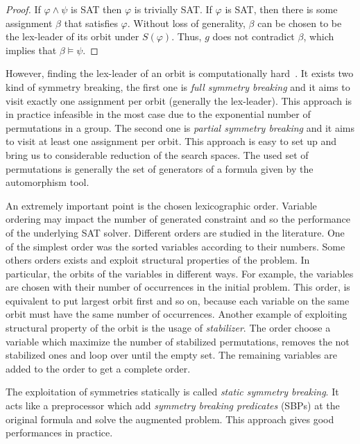 \begin{proof}
	If $\varphi \wedge \psi$ is SAT then $\varphi$ is trivially SAT. If
	$\varphi$ is SAT, then there is some assignment $\beta$ that satisfies $\varphi$.
	Without loss of generality, $\beta$ can be chosen to be the lex-leader of its
	orbit under $S(\varphi)$. Thus, $g$ does not contradict $\beta$, which implies that
	$\beta \models \psi$.
\end{proof}

 


However, finding the lex-leader of an orbit is computationally hard~\cite{Luks2004}.
It exists two kind of symmetry breaking, the first one is \emph{full symmetry breaking} and it 
aims to visit exactly one assignment per orbit (generally the lex-leader). This
approach is in practice infeasible in the most case due to the exponential number of permutations in a group.
The second one is \emph{partial symmetry breaking} and it aims to visit at least one assignment per orbit. This approach is easy to set up and bring us to considerable reduction of the search spaces. The used set
of permutations is generally the set of generators of a formula given by the automorphism tool.


An extremely important point is the chosen lexicographic order.
Variable ordering may impact the number of generated constraint and so the performance of
the underlying SAT solver. Different orders are studied in the literature. 
One of the simplest order was the sorted variables according to their numbers.
Some others orders exists and exploit structural properties of the 
problem. In particular, the orbits of the variables in different ways. For example, the variables are chosen 
with their number of occurrences in the initial problem. This order, is equivalent to put largest orbit first
and so on, because each variable on the same orbit must have the same number of occurrences.
Another example of exploiting structural property of the orbit is the usage of \emph{stabilizer}.
The order choose a variable which maximize the number of stabilized permutations, removes the not stabilized ones and loop over until the empty set. The remaining variables are added to the order to get a complete order.



The exploitation of symmetries statically is called \emph{static symmetry breaking}.
It acts like a preprocessor which add \emph{symmetry breaking predicates} (SBPs) at the 
original formula and solve the augmented problem. 
This approach gives good performances in practice.

